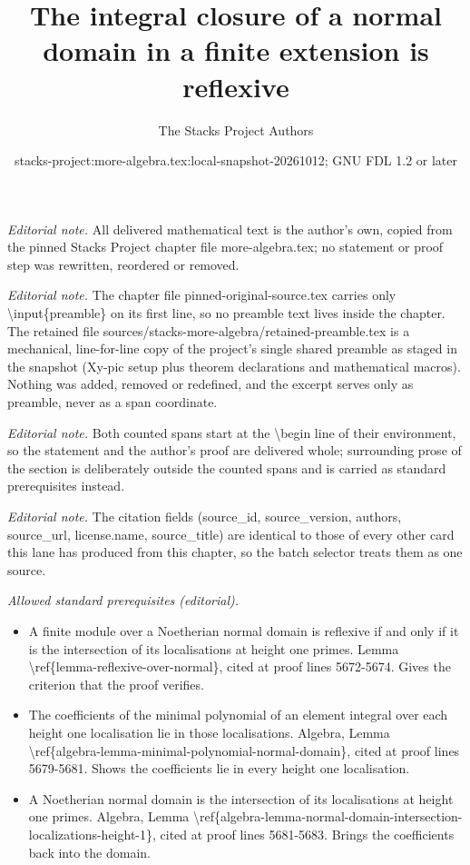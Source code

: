 \documentclass[10pt,a4paper]{amsart}
\title{The integral closure of a normal domain in a finite extension is reflexive}
\author{The Stacks Project Authors}
\date{stacks-project:more-algebra.tex:local-snapshot-20261012; GNU FDL 1.2 or later}
\theoremstyle{plain}
\theoremstyle{definition}
\theoremstyle{remark}
\numberwithin{equation}{subsection}
\begin{document}
\maketitle
\setcounter{subsection}{1}
\noindent\textit{Editorial note.} All delivered mathematical text is the author's own, copied from the pinned Stacks Project chapter file more-algebra.tex; no statement or proof step was rewritten, reordered or removed.\par\medskip
\noindent\textit{Editorial note.} The chapter file pinned-original-source.tex carries only \textbackslash{}input\{preamble\} on its first line, so no preamble text lives inside the chapter. The retained file sources/stacks-more-algebra/retained-preamble.tex is a mechanical, line-for-line copy of the project's single shared preamble as staged in the snapshot (Xy-pic setup plus theorem declarations and mathematical macros). Nothing was added, removed or redefined, and the excerpt serves only as preamble, never as a span coordinate.\par\medskip
\noindent\textit{Editorial note.} Both counted spans start at the \textbackslash{}begin line of their environment, so the statement and the author's proof are delivered whole; surrounding prose of the section is deliberately outside the counted spans and is carried as standard prerequisites instead.\par\medskip
\noindent\textit{Editorial note.} The citation fields (source\_id, source\_version, authors, source\_url, license.name, source\_title) are identical to those of every other card this lane has produced from this chapter, so the batch selector treats them as one source.\par\medskip
\noindent\textit{Allowed standard prerequisites (editorial).}\begin{itemize}
\item A finite module over a Noetherian normal domain is reflexive if and only if it is the intersection of its localisations at height one primes. Lemma \textbackslash{}ref\{lemma-reflexive-over-normal\}, cited at proof lines 5672-5674. Gives the criterion that the proof verifies.
\item The coefficients of the minimal polynomial of an element integral over each height one localisation lie in those localisations. Algebra, Lemma \textbackslash{}ref\{algebra-lemma-minimal-polynomial-normal-domain\}, cited at proof lines 5679-5681. Shows the coefficients lie in every height one localisation.
\item A Noetherian normal domain is the intersection of its localisations at height one primes. Algebra, Lemma \textbackslash{}ref\{algebra-lemma-normal-domain-intersection-localizations-height-1\}, cited at proof lines 5681-5683. Brings the coefficients back into the domain.
\end{itemize}\medskip
\end{document}
